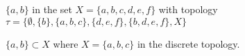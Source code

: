\begin{pa}
\begin{comment}

\solution Neither $a$ nor $b$ is a limit point of $\{c,d\}$ since the open neighborhood $\{a,b\}$ contains no point in $\{c,d\}$ different than $a$ or $b$. The only open set that contains $c$ or $d$ is $X$, so that is the only neighborhood of $c$ or $d$. Since $X$ contains a point in $\{c,d]{$ that is different than $c$ (or $d$), both $c$ and $d$ are limit points of $\{c,d\}$. 




\end{comment}


	\item $\{a,b\}$ in the set $X= \{a,b,c,d,e,f\}$ with topology $\tau= \{\emptyset,\{b\}, \{a,b,c\},\{d,e,f\},\{b,d,e,f\}, X\}$ 



\begin{comment}

\solution None of the points $b$, $d$, $e$, or $f$ is a limit point of $\{a,b\}$ since the open neighborhood $\{b,d,e,f\}$ contains no point in $\{a,b\}$ different than $b$, $d$, $e$, or $f$. Any neighborhood of $a$ or $c$ must contain one of the open sets $\{a,b,c\}$ or $X$. So every neighborhood of $a$ or $c$ contains a point of $\{a,b\}$ different than $a$ or $c$. Therefore, the limit points of $\{a,b\}$ are $a$ and $c$ and $\{a,b\}' = \{a,c\}$. 




\end{comment}


	\item $\{a,b\} \subset X$ where $X = \{a,b,c\}$ in the discrete topology. 



\begin{comment}

\solution For any $x \in \{a,b\}$, the open neighborhood $\{x\}$ of $x$ does not contain any points in $\{a,b\}$ different than $x$. So the set $\{a,b\}$ has no limit points. 



\end{comment}
 

\ea

\ee



\end{pa}


